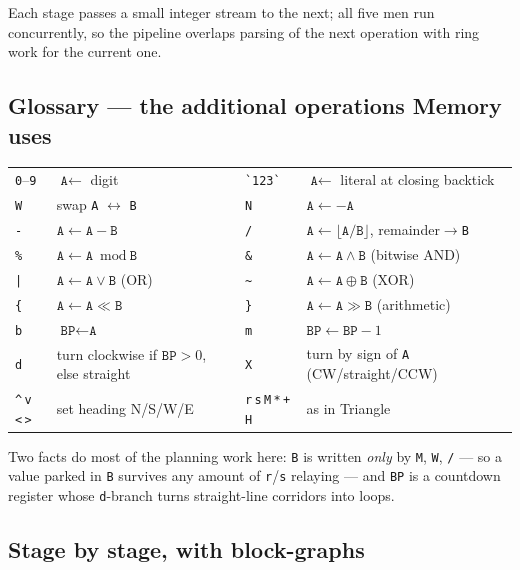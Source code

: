 \documentclass[11pt,a4paper]{article}
\newcommand{\op}[1]{\texttt{#1}}
\begin{document}
Each stage passes a small integer stream to the next; all five men run
concurrently, so the pipeline overlaps parsing of the next operation with
ring work for the current one.

\subsection{Glossary --- the additional operations Memory uses}

\begin{center}
\small
\begin{tabular}{ll@{\quad}ll}
\op{0}--\op{9} & $\op{A}\leftarrow$ digit &
\verb|`123`| & $\op{A}\leftarrow$ literal at closing backtick\\
\op{W} & swap \op{A} $\leftrightarrow$ \op{B} &
\op{N} & $\op{A}\leftarrow-\op{A}$\\
\op{-} & $\op{A}\leftarrow\op{A}-\op{B}$ &
\op{/} & $\op{A}\leftarrow\lfloor\op{A}/\op{B}\rfloor$, remainder$\to$\op{B}\\
\op{\%} & $\op{A}\leftarrow\op{A}\bmod \op{B}$ &
\op{\&} & $\op{A}\leftarrow\op{A}\wedge\op{B}$ (bitwise AND)\\
\op{|} & $\op{A}\leftarrow\op{A}\vee\op{B}$ (OR) &
\op{\~{}} & $\op{A}\leftarrow\op{A}\oplus\op{B}$ (XOR)\\
\op{\{} & $\op{A}\leftarrow\op{A}\ll\op{B}$ &
\op{\}} & $\op{A}\leftarrow\op{A}\gg\op{B}$ (arithmetic)\\
\op{b} & $\op{BP}\leftarrow\op{A}$ &
\op{m} & $\op{BP}\leftarrow\op{BP}-1$\\
\op{d} & turn clockwise if $\op{BP}>0$, else straight &
\op{X} & turn by sign of \op{A} (CW/straight/CCW)\\
\op{\^{}}\,\op{v}\,\op{<}\,\op{>} & set heading N/S/W/E &
\op{r}\,\op{s}\,\op{M}\,\op{*}\,\op{+}\,\op{H} & as in Triangle\\
\end{tabular}
\end{center}

Two facts do most of the planning work here: \op{B} is written \emph{only}
by \op{M}, \op{W}, \op{/} --- so a value parked in \op{B} survives any
amount of \op{r}/\op{s} relaying --- and \op{BP} is a countdown register
whose \op{d}-branch turns straight-line corridors into loops.

\subsection{Stage by stage, with block-graphs}
\end{document}
